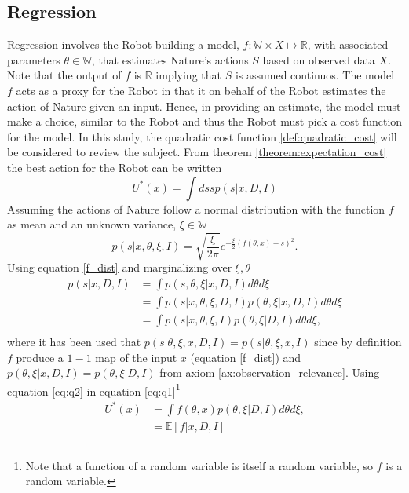 \subsection{Regression}
\label{sec:regression}
Regression involves the Robot building a model, $f: \mathbb{W}\times X\mapsto\mathbb{R}$, with associated parameters $\theta\in \mathbb{W}$, that estimates Nature's actions $S$ based on observed data $X$. Note that the output of $f$ is $\mathbb{R}$ implying that $S$ is assumed continuos. The model $f$ acts as a proxy for the Robot in that it on behalf of the Robot estimates the action of Nature given an input. Hence, in providing an estimate, the model must make a choice, similar to the Robot and thus the Robot must pick a cost function for the model. In this study, the quadratic cost function \ref{def:quadratic_cost} will be considered to review the subject. From theorem \ref{theorem:expectation_cost} the best action for the Robot can be written
\begin{equation}
	U^*(x) = \int ds s p(s|x,D,I)
	\label{eq:q1}
\end{equation}
Assuming the actions of Nature follow a normal distribution with the function $f$ as mean and an unknown variance, $\xi\in \mathbb{W}$
\begin{equation}
	p(s|x,\theta,\xi,I)=\sqrt{\frac{\xi}{2\pi}} e^{-\frac{\xi}{2}(f(\theta,x)-s)^2}.
	\label{f_dist}
\end{equation}
Using equation \eqref{f_dist} and marginalizing over $\xi,\theta$
\begin{equation}
	\begin{split}
		p(s|x,D,I) &= \int p(s,\theta,\xi|x,D,I) d\theta d\xi\\
		& = \int p(s|x,\theta,\xi,D,I)  p(\theta,\xi|x,D,I)d\theta d\xi\\
		& = \int p(s|x,\theta,\xi,I)  p(\theta,\xi|D,I)d\theta d\xi,\\
	\end{split}
	\label{eq:q2}
\end{equation}
where it has been used that $p(s|\theta,\xi,x,D,I) = p(s|\theta,\xi,x,I)$ since by definition $f$ produce a $1-1$ map of the input $x$ (equation \eqref{f_dist}) and $p(\theta,\xi|x,D,I) = p(\theta,\xi|D,I)$ from axiom \ref{ax:observation_relevance}. Using equation \eqref{eq:q2} in equation \eqref{eq:q1}\footnote{Note that a function of a random variable is itself a random variable, so $f$ is a random variable.}
\begin{equation}
	\begin{split}
		U^*(x) & = \int f(\theta,x)  p(\theta,\xi|D,I) d\theta d\xi,\\
		& = \mathbb{E}[f|x,D,I]
	\end{split}
	\label{eq:q3}
\end{equation}	
